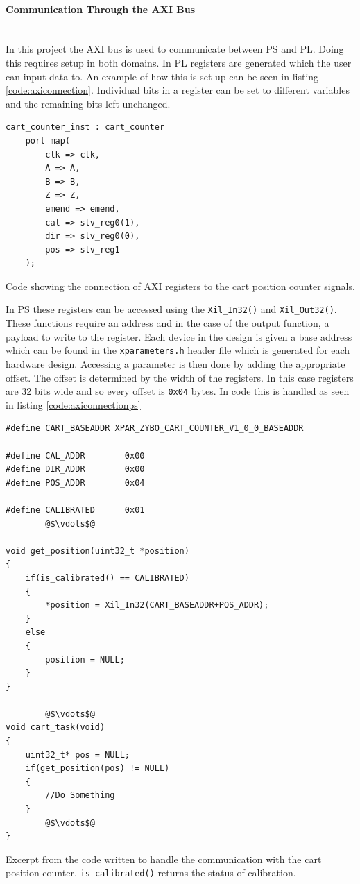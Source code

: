 \paragraph{Communication Through the AXI Bus}~\\ %
\label{par:communication_through_the_axi_bus}
In this project the AXI bus is used to communicate between PS and PL.
Doing this requires setup in both domains.
In PL registers are generated which the user can input data to.
An example of how this is set up can be seen in listing \ref{code:axiconnection}.
Individual bits in a register can be set to different variables and the remaining bits left unchanged.

\begin{listing}[H]
\begin{verbatim}
cart_counter_inst : cart_counter
	port map(
	    clk => clk,
	    A => A,
	    B => B,
	    Z => Z,
	    emend => emend,
	    cal => slv_reg0(1),
	    dir => slv_reg0(0),
	    pos => slv_reg1
	);
\end{verbatim}
\caption{Code showing the connection of AXI registers to the cart position counter signals.}
\label{code:axiconnection}
\end{listing}

In PS these registers can be accessed using the \texttt{Xil\_In32()} and \texttt{Xil\_Out32()}.
These functions require an address and in the case of the output function, a payload to write to the register.
Each device in the design is given a base address which can be found in the \texttt{xparameters.h} header file which is generated for each hardware design.
Accessing a parameter is then done by adding the appropriate offset.
The offset is determined by the width of the registers.
In this case registers are 32 bits wide and so every offset is \texttt{0x04} bytes.
In code this is handled as seen in listing \ref{code:axiconnectionps}

\begin{listing}[H]
\begin{verbatim}
#define CART_BASEADDR XPAR_ZYBO_CART_COUNTER_V1_0_0_BASEADDR

#define CAL_ADDR		0x00
#define DIR_ADDR		0x00
#define POS_ADDR		0x04
	
#define CALIBRATED		0x01
		@$\vdots$@
	
void get_position(uint32_t *position)
{
	if(is_calibrated() == CALIBRATED)
	{
		*position = Xil_In32(CART_BASEADDR+POS_ADDR);
	}
	else
	{
		position = NULL;
	}
}

		@$\vdots$@
void cart_task(void)
{
	uint32_t* pos = NULL;
	if(get_position(pos) != NULL)
	{
		//Do Something
	}
		@$\vdots$@
}
\end{verbatim}
\caption[Excerpt from the code written to handle the communication with the cart position counter.]{Excerpt from the code written to handle the communication with the cart position counter. \texttt{is\_calibrated()} returns the status of calibration.}
\label{code:axiconnectionps}
\end{listing}

